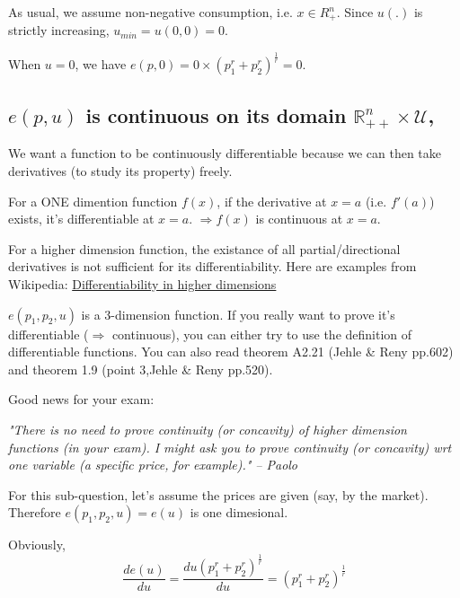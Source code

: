 \documentclass{article}
\newcommand{\R}{\mathbb{R}}
\begin{document}
As usual, we assume non-negative consumption, i.e. $x \in R^n_+$. Since $u(.)$ is strictly increasing,
$u_{min} = u(0,0) = 0$. 

When $u = 0$, we have $e(p,0) = 0 \times (p_1^{r} + p_2^{r})^{\frac{1}{r}} =0$.


\subsection{$e(p, u)$ is continuous on its domain $\R^n_{++} \times \mathcal{U}$,}


\begin{mdframed}[backgroundcolor=blue!20,linecolor=white]
We want a function to be continuously differentiable because we can then take derivatives (to study its property) freely.

For a ONE dimention function $f(x)$, if the derivative at $x = a$ (i.e. $f'(a)$) exists, it's differentiable at $x = a$.
$\Rightarrow f(x)$ is continuous at $x = a$.

For a higher dimension function, the existance of all partial/directional derivatives is not
sufficient for its differentiability. Here are examples from Wikipedia: \href{https://en.wikipedia.org/wiki/Differentiable_function}{Differentiability in higher dimensions}

$e(p_1,p_2,u)$ is a 3-dimension function. If you really want to prove it's differentiable ($\Rightarrow$ continuous), you can either try to use the definition of differentiable functions. You can also read theorem A2.21 (Jehle \& Reny pp.602) and theorem 1.9 (point 3,Jehle \& Reny  pp.520).
\end{mdframed}

\begin{mdframed}[backgroundcolor=yellow!20,linecolor=white]
Good news for your exam:

\textit{"There is no need to prove continuity (or concavity) of higher dimension functions (in your exam). I might ask you to prove continuity (or concavity) wrt one variable (a specific price, for example)." -- Paolo}
\end{mdframed}



For this sub-question, let's assume the prices are given (say, by the market). Therefore
$e(p_1,p_2,u) = e(u)$ is one dimesional.

Obviously, $$\frac{d e(u)}{d u} = \frac{d u(p_1^{r} + p_2^{r})^{\frac{1}{r}} }{d u} = (p_1^{r} + p_2^{r})^{\frac{1}{r}}$$
\end{document}
